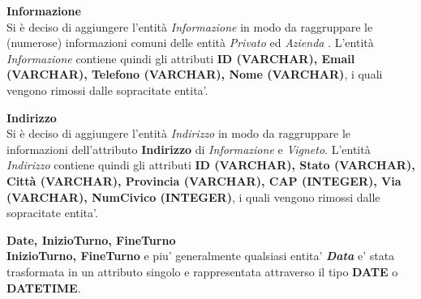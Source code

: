 \textbf{\large{Informazione}}\\
Si è deciso di aggiungere l'entità \emph{Informazione} in modo da raggruppare le (numerose) informazioni comuni delle entità \emph{Privato} ed \emph{Azienda} . L'entità \emph{Informazione} contiene quindi gli attributi \textbf{ID (VARCHAR), Email (VARCHAR), Telefono (VARCHAR), Nome (VARCHAR)}, i quali vengono rimossi dalle sopracitate entita'.

\begin{flushleft}
\textbf{\large{Indirizzo}}\\
Si è deciso di aggiungere l'entità \emph{Indirizzo} in modo da raggruppare le informazioni dell'attributo \textbf{Indirizzo} di \emph{Informazione} e \emph{Vigneto}. L'entità \emph{Indirizzo} contiene quindi gli attributi \textbf{ID (VARCHAR), Stato (VARCHAR), Città (VARCHAR), Provincia (VARCHAR), CAP (INTEGER), Via (VARCHAR), NumCivico (INTEGER)}, i quali vengono rimossi dalle sopracitate entita'.
\end{flushleft}

\begin{flushleft}
\textbf{\large{Date, InizioTurno, FineTurno}}\\
\textbf{InizioTurno, FineTurno} e piu' generalmente qualsiasi entita' \textbf{\emph{Data}} e' stata trasformata in un attributo singolo e rappresentata attraverso il tipo \textbf{DATE} o \textbf{DATETIME}.
\end{flushleft}
